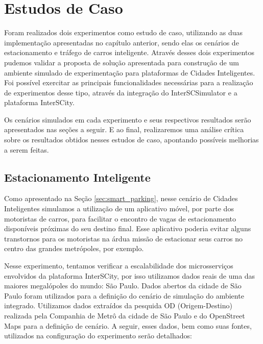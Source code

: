 \chapter{Estudos de Caso}
\label{cap:estudos-de-caso}


Foram realizados dois experimentos como estudo de caso, utilizando as duas implementação apresentadas no capítulo anterior, sendo elas os cenários de estacionamento e tráfego de carros inteligente.
Através desses dois experimentos pudemos validar a proposta de solução apresentada para construção de um ambiente simulado de experimentação para plataformas de Cidades Inteligentes.
Foi possível exercitar as principais funcionalidades necessárias para a realização de experimentos desse tipo, através da integração do InterSCSimulator e a plataforma InterSCity.

Os cenários simulados em cada experimento e seus respectivos resultados serão apresentados nas seções a seguir.
E ao final, realizaremos uma análise crítica sobre os resultados obtidos nesses estudos de caso, apontando possíveis melhorias a serem feitas.

\section{Estacionamento Inteligente}
\label{sec:exp_smart_parking}

Como apresentado na Seção \ref{sec:smart_parking}, nesse cenário de Cidades Inteligentes simulamos a utilização de um aplicativo móvel, por parte dos motoristas de carros, para facilitar o encontro de
vagas de estacionamento disponíveis próximas do seu destino final.
Esse aplicativo poderia evitar alguns transtornos para os motoristas na árdua missão de estacionar seus carros no centro das grandes metrópoles, por exemplo.

Nesse experimento, tentamos verificar a escalabilidade dos microsserviços envolvidos da plataforma InterSCity, por isso utilizamos dados reais de uma das maiores megalópoles do mundo: São Paulo.
Dados abertos da cidade de São Paulo foram utilizados para a definição do cenário de simulação do ambiente integrado.
Utilizamos dados extraídos da pesquida OD (Origem-Destino) realizada pela Companhia de Metrô da cidade de São Paulo e do OpenStreet Maps para a definição de cenário.
A seguir, esses dados, bem como suas fontes, utilizados na configuração do experimento serão detalhados:

